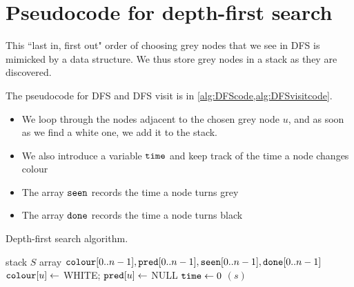 %
%
%

\section{Pseudocode for depth-first search}
\label{ss: DFS}

This ``last in, first
out" order of choosing grey nodes that we see in DFS is mimicked  by a  data structure. We thus store grey nodes in a stack as they are discovered. 

The pseudocode for DFS and DFS visit is in \cref{alg:DFScode,alg:DFSvisitcode}. 

\begin{itemize}
\item We loop through the nodes adjacent to the chosen grey node
$u$, and as soon as we find a white one, we add it to the stack.
\item We also introduce a variable $\timeVar$ and keep track of the time a node changes colour
\item The array $\seen$ records the time a node turns grey
\item The array  $\done$ records the time a node turns black
\end{itemize}

\begin{algorithm}[H]
  \caption{Depth-first search algorithm.}
    \label{alg:DFScode}
\begin{algorithmic}[1]
	\State stack $S$  
	\State array $\colour[0..n-1], \pred[0..n-1], \seen[0..n-1], \done[0..n-1]$
		\State $\colour[u] \gets $ WHITE; $\pred[u] \gets $ NULL
	\EndFor
	\State $\timeVar \gets 0$
			\State {}$(s)$
		\EndIf
	\EndFor
	\State \Return{$\pred, \seen, \done$}
\EndFunction
\end{algorithmic}
\end{algorithm}

